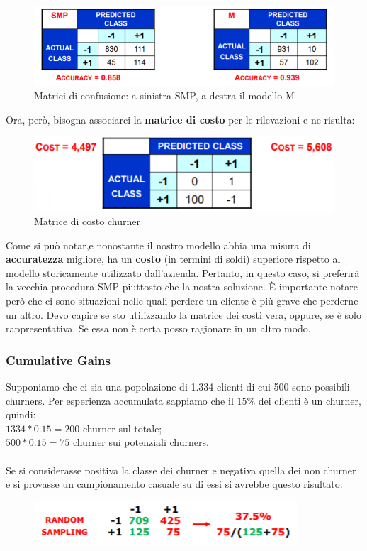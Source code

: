 \begin{figure}[H]
	\hspace{-0.3cm}
	\includegraphics[height=0.3 \linewidth]{classification/pict/esConfMatr.png}
	\caption{Matrici di confusione: a sinistra SMP, a destra il modello M}
\end{figure}
Ora, però, bisogna associarci la \textbf{matrice di costo} per le rilevazioni e ne risulta:
\begin{figure}[H]
	\centering
	\includegraphics[height=0.2 \linewidth]{classification/pict/esMatrCosto.png}
	\caption{Matrice di costo churner}
\end{figure}
Come si può notar,e nonostante il nostro modello abbia una misura di \textbf{accuratezza} migliore, ha un \textbf{costo} (in termini di soldi) superiore rispetto al modello storicamente utilizzato dall'azienda. Pertanto, in questo caso, si preferirà la vecchia procedura SMP piuttosto che la nostra soluzione.
\`E importante notare però che ci sono situazioni nelle quali perdere un cliente è più grave che perderne un altro. Devo capire se sto utilizzando la matrice dei costi vera, oppure, se è solo rappresentativa. Se essa non è certa posso ragionare in un altro modo.

\subsubsection{Cumulative Gains} 
Supponiamo che ci sia una popolazione di 1.334 clienti di cui 500 sono possibili churners. Per esperienza accumulata sappiamo che il $15\%$ dei clienti è un churner, quindi:
\\$1334*0.15 = 200$ churner sul totale;
\\$500*0.15 = 75$ churner sui potenziali churners.
\\\\
Se si considerasse positiva la classe dei churner e negativa quella dei non churner e si provasse un campionamento casuale su di essi si avrebbe questo risultato:
\begin{figure}[H]
	\centering
	\includegraphics[height=0.1 \linewidth]{classification/pict/esChurnerRandom.png}
\end{figure}

